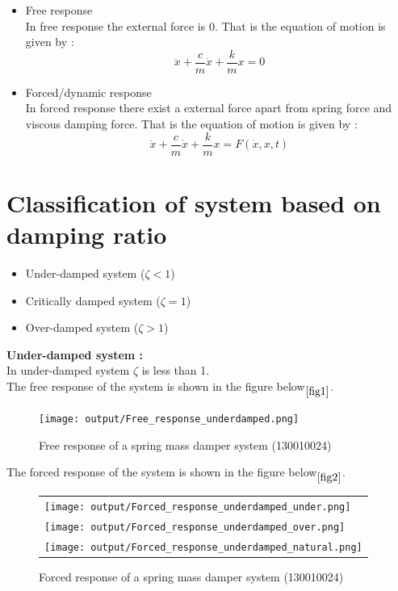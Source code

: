 \documentclass[11pt]{article}
\begin{document}
\begin{itemize}
	\item{Free response}\\
	In free response the external force is 0. That is the equation of 
	motion is given by :
	$$ \ddot{x} + \frac{c}{m}\dot{x} + \frac{k}{m}x = 0 $$

	\item{Forced/dynamic response}\\
	In forced response there exist a external force apart from spring force and 
	viscous damping force. That is the equation of motion is given by :
	$$ \ddot{x} + \frac{c}{m}\dot{x} + \frac{k}{m}x = F(\dot{x},x,t) $$

\end{itemize}


\section{Classification of system based on damping ratio}
\begin{itemize}
	\item{Under-damped system ($\zeta < 1$)}
	\item{Critically damped system ($\zeta = 1$)}
	\item{Over-damped system ($\zeta > 1$)}
\end{itemize}

\newpage
\noindent\textbf{Under-damped system :} \\
In under-damped system $\zeta$ is less than 1. \\
The free response of the system is shown in the figure below$\phantom{}_{\ref{fig1}}$.

\begin{figure}[H]
	\centering
	\centering
	\texttt{[image: output/Free\_response\_underdamped.png]}
	\caption{Free response of a spring mass damper system (130010024)}
\end{figure}
\label{fig1}

\newpage
The forced response of the system is shown in the figure below$\phantom{}_{\ref{fig2}}$.
\begin{figure}[H]
	\centering
	\begin{tabular} {l}
	\texttt{[image: output/Forced\_response\_underdamped\_under.png]} \\
	\texttt{[image: output/Forced\_response\_underdamped\_over.png]} \\
	\texttt{[image: output/Forced\_response\_underdamped\_natural.png]} 
	\end{tabular}
	\caption{Forced response of a spring mass damper system (130010024)}
\end{figure}
\label{fig2}
\end{document}
